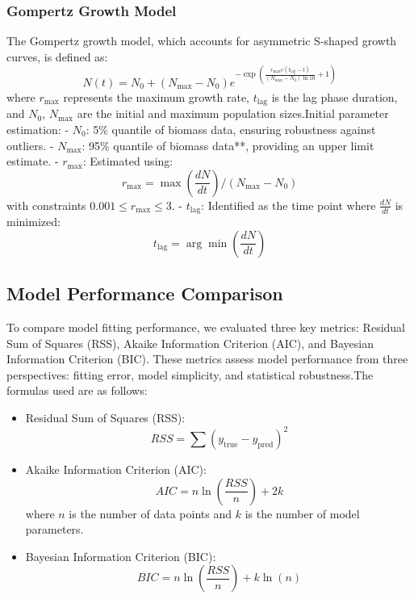 \documentclass[11pt]{article}
\begin{document}
\subsubsection{Gompertz Growth Model}

The Gompertz growth model, which accounts for asymmetric S-shaped growth curves, is defined as:
\[
N(t) = N_0 + (N_{\max} - N_0) e^{-\exp \left( \frac{r_{\max} e (t_{\text{lag}} - t)}{(N_{\max} - N_0) \ln 10} + 1  \right)}
\]
where \( r_{\max} \) represents the maximum growth rate, \( t_{\text{lag}} \) is the lag phase duration, and \( N_0 \), \( N_{\max} \) are the initial and maximum population sizes.Initial parameter estimation:
- \( N_0 \): 5\% quantile of biomass data, ensuring robustness against outliers.
- \( N_{\max} \): 95\% quantile of biomass data**, providing an upper limit estimate.
- \( r_{\max} \): Estimated using:
  \[
  r_{\max} = \max\left( \frac{dN}{dt} \right) / (N_{\max} - N_0)
  \]
  with constraints \( 0.001 \leq r_{\max} \leq 3 \).
- \( t_{\text{lag}} \): Identified as the time point where \( \frac{dN}{dt} \) is minimized:
  \[
  t_{\text{lag}} = \arg\min\left( \frac{dN}{dt} \right)
  \]

\subsection{Model Performance Comparison}

To compare model fitting performance, we evaluated three key metrics: Residual Sum of Squares (RSS), Akaike Information Criterion (AIC), and Bayesian Information Criterion (BIC). These metrics assess model performance from three perspectives: fitting error, model simplicity, and statistical robustness.The formulas used are as follows:

\begin{itemize}
    \item Residual Sum of Squares (RSS):
    \[
    RSS = \sum (y_{\text{true}} - y_{\text{pred}})^2
    \]
    
    \item Akaike Information Criterion (AIC):
    \[
    AIC = n \ln \left(\frac{RSS}{n}\right) + 2k
    \]
    where \( n \) is the number of data points and \( k \) is the number of model parameters.
    
    \item Bayesian Information Criterion (BIC):
    \[
    BIC = n \ln \left(\frac{RSS}{n}\right) + k \ln(n)
    \]
\end{itemize}
\end{document}
